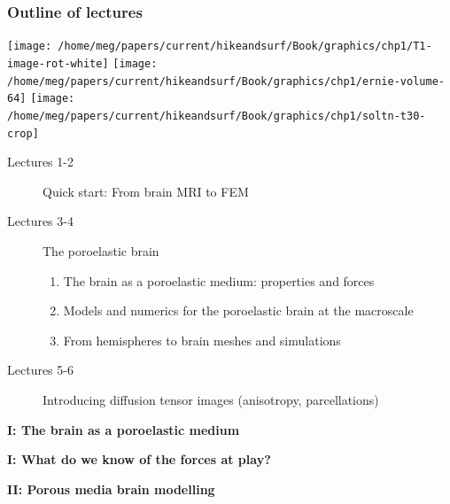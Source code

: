 \documentclass[10pt, mathserif, aspectratio=169, t]{beamer}
\newcommand{\mysection}[1]{\begin{frame} \begin{center} \vspace{3em} \textbf{#1} \end{center} \end{frame}}
\begin{document}
\begin{frame}
  \frametitle{Outline of lectures}
  \begin{center}
  \texttt{[image: /home/meg/papers/current/hikeandsurf/Book/graphics/chp1/T1-image-rot-white]}
  \texttt{[image: /home/meg/papers/current/hikeandsurf/Book/graphics/chp1/ernie-volume-64]}
  \texttt{[image: /home/meg/papers/current/hikeandsurf/Book/graphics/chp1/soltn-t30-crop]}
  \end{center}
  \begin{description}
    \item[Lectures 1-2] Quick start: From brain MRI to FEM
    \item[Lectures 3-4] The poroelastic brain  
      \begin{enumerate}[I]
      \item
        The brain as a poroelastic medium: properties and forces
      \item
        Models and numerics for the poroelastic brain at the macroscale
      \item
        From hemispheres to brain meshes and simulations
      \end{enumerate}
    \item[Lectures 5-6] Introducing diffusion tensor images (anisotropy, parcellations)
  \end{description}
\end{frame}

\graphicspath{{/home/meg/presentations/slidesx/}}

\mysection{I: The brain as a poroelastic medium}







\mysection{I: What do we know of the forces at play?}




\mysection{II: Porous media brain modelling}




\end{document}
